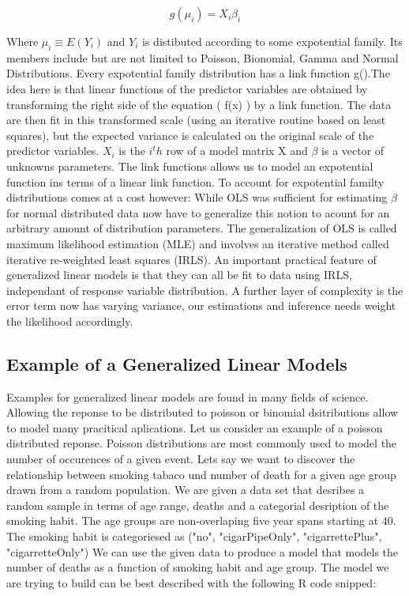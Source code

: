\documentclass{article}
\begin{document}
        \begin{equation} g(\mu_i) = X_i \beta_i \end{equation}


    Where $\mu_i \equiv E(Y_i)$ and $Y_i$ is distibuted according to some expotential family. Its members include but are not limited to Poisson, Bionomial, Gamma and Normal Distributions. Every expotential family distribution has a link function g().The idea here is that linear functions of the predictor variables are obtained by transforming the right side of the equation ( f(x) ) by a link function.  The data are then fit in this transformed scale (using an iterative routine based on least squares), but the expected variance is calculated on the original scale of the predictor variables. $X_i$ is the $i^th$ row of a model matrix X and $\beta$ is a vector of unknowns parameters. The link functions allows us to model an expotential function ins terms of a linear link function. To account for expotential familty distributions comes at a cost however: While OLS was sufficient for estimating $\beta$ for normal distributed data now have to generalize this notion to acount for an arbitrary amount of distribution parameters. The generalization of OLS is called maximum likelihood estimation (MLE) and involves an iterative method called iterative re-weighted least squares (IRLS). An important practical feature of generalized linear models is that they can all be fit to data using IRLS, independant of response variable distribution. A further layer of complexity is the error term now has varying variance, our estimations and inference needs weight the likelihood accordingly.

    \subsection{Example of a Generalized Linear Models}
    Examples for generalized linear models are found in many fields of science. Allowing the reponse to be distributed to poisson or binomial dsitributions allow to model many pracitical aplications. Let us consider an example of a poisson distributed reponse. Poisson distributions are most commonly used to model the number of occurences of a given event. Lets say we want to discover the relationship between smoking tabaco und number of death for a given age group drawn from a random population. We are given a data set that desribes a random sample in terms of age range, deaths and a categorial desription of the smoking habit. The age groups are non-overlaping five year spans starting at 40. The smoking habit is categoriesed as ("no", "cigarPipeOnly", "cigarrettePlus", "cigarretteOnly") We can use the given data to produce a model that models the number of deaths as a function of smoking habit and age group. The model we are trying to build can be best described with the following R code snipped:
\end{document}
